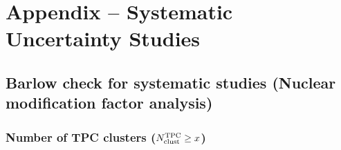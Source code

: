 \clearpage
\section{Appendix -- Systematic Uncertainty Studies}\label{append:systematics}

\subsection{Barlow check for systematic studies (Nuclear modification factor analysis)}
\label{appe:barlow_RpPb}

\subsubsection{Number of TPC clusters ($N_{\rm{clust}}^{\rm{TPC}} \geq x$)}
\label{subsub:appe_sys_RpPb_NTPCclust}

